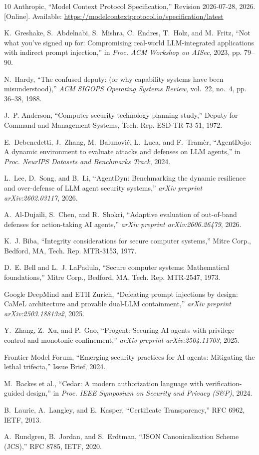 \documentclass[conference]{IEEEtran}
\begin{document}
\begin{thebibliography}{10}
Anthropic, ``Model Context Protocol Specification,'' Revision 2026-07-28, 2026. [Online]. Available: \url{https://modelcontextprotocol.io/specification/latest}

K.~Greshake, S.~Abdelnabi, S.~Mishra, C.~Endres, T.~Holz, and M.~Fritz, ``Not what you've signed up for: Compromising real-world LLM-integrated applications with indirect prompt injection,'' in \emph{Proc. ACM Workshop on AISec}, 2023, pp. 79--90.

N.~Hardy, ``The confused deputy: (or why capability systems have been misunderstood),'' \emph{ACM SIGOPS Operating Systems Review}, vol.~22, no.~4, pp. 36--38, 1988.

J.~P. Anderson, ``Computer security technology planning study,'' Deputy for Command and Management Systems, Tech. Rep. ESD-TR-73-51, 1972.

E.~Debenedetti, J.~Zhang, M.~Balunovi{\'c}, L.~Luca, and F.~Tram{\`e}r, ``AgentDojo: A dynamic environment to evaluate attacks and defenses on LLM agents,'' in \emph{Proc. NeurIPS Datasets and Benchmarks Track}, 2024.

L.~Lee, D.~Song, and B.~Li, ``AgentDyn: Benchmarking the dynamic resilience and over-defense of LLM agent security systems,'' \emph{arXiv preprint arXiv:2602.03117}, 2026.

A.~Al-Dujaili, S.~Chen, and R.~Shokri, ``Adaptive evaluation of out-of-band defenses for action-taking AI agents,'' \emph{arXiv preprint arXiv:2606.26479}, 2026.

K.~J. Biba, ``Integrity considerations for secure computer systems,'' Mitre Corp., Bedford, MA, Tech. Rep. MTR-3153, 1977.

D.~E. Bell and L.~J. LaPadula, ``Secure computer systems: Mathematical foundations,'' Mitre Corp., Bedford, MA, Tech. Rep. MTR-2547, 1973.

Google DeepMind and ETH Zurich, ``Defeating prompt injections by design: CaMeL architecture and provable dual-LLM containment,'' \emph{arXiv preprint arXiv:2503.18813v2}, 2025.

Y.~Zhang, Z.~Xu, and P.~Gao, ``Progent: Securing AI agents with privilege control and monotonic confinement,'' \emph{arXiv preprint arXiv:2504.11703}, 2025.

Frontier Model Forum, ``Emerging security practices for AI agents: Mitigating the lethal trifecta,'' Issue Brief, 2024.

M.~Backes et al., ``Cedar: A modern authorization language with verification-guided design,'' in \emph{Proc. IEEE Symposium on Security and Privacy (S\&P)}, 2024.

B.~Laurie, A.~Langley, and E.~Kasper, ``Certificate Transparency,'' RFC 6962, IETF, 2013.

A.~Rundgren, B.~Jordan, and S.~Erdtman, ``JSON Canonicalization Scheme (JCS),'' RFC 8785, IETF, 2020.
\end{thebibliography}
\end{document}

